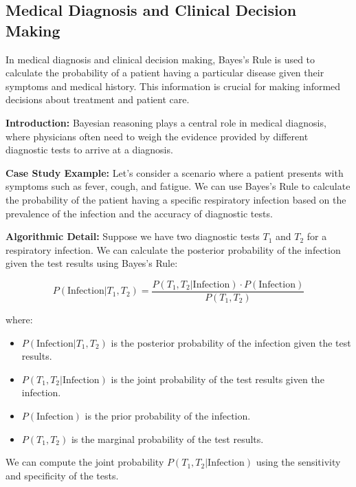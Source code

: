 \documentclass[12pt]{book} %
\begin{document}
\subsection{Medical Diagnosis and Clinical Decision Making}

In medical diagnosis and clinical decision making, Bayes's Rule is used to calculate the probability of a patient having a particular disease given their symptoms and medical history. This information is crucial for making informed decisions about treatment and patient care.

\textbf{Introduction:} Bayesian reasoning plays a central role in medical diagnosis, where physicians often need to weigh the evidence provided by different diagnostic tests to arrive at a diagnosis.

\textbf{Case Study Example:} Let's consider a scenario where a patient presents with symptoms such as fever, cough, and fatigue. We can use Bayes's Rule to calculate the probability of the patient having a specific respiratory infection based on the prevalence of the infection and the accuracy of diagnostic tests.

\textbf{Algorithmic Detail:}
Suppose we have two diagnostic tests \(T_1\) and \(T_2\) for a respiratory infection. We can calculate the posterior probability of the infection given the test results using Bayes's Rule:

\[
P(\text{Infection} | T_1, T_2) = \frac{P(T_1, T_2 | \text{Infection}) \cdot P(\text{Infection})}{P(T_1, T_2)}
\]

where:
\begin{itemize}
    \item \(P(\text{Infection} | T_1, T_2)\) is the posterior probability of the infection given the test results.
    \item \(P(T_1, T_2 | \text{Infection})\) is the joint probability of the test results given the infection.
    \item \(P(\text{Infection})\) is the prior probability of the infection.
    \item \(P(T_1, T_2)\) is the marginal probability of the test results.
\end{itemize}

We can compute the joint probability \(P(T_1, T_2 | \text{Infection})\) using the sensitivity and specificity of the tests.
\end{document}

